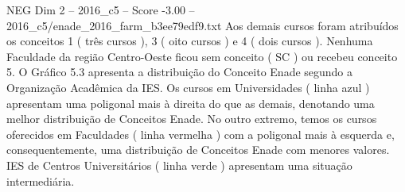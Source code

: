 \begin{textsample}{NEG Dim 2 – 2016\_c5 – Score -3.00 – 2016\_c5/enade\_2016\_farm\_b3ee79edf9.txt}
Aos demais cursos foram atribuídos os conceitos 1 ( três cursos ), 3 ( oito cursos ) e 4 ( dois cursos ).
Nenhuma Faculdade da região Centro-Oeste ficou sem conceito ( SC ) ou recebeu conceito 5.
O Gráfico 5.3 apresenta a distribuição do Conceito Enade segundo a Organização Acadêmica da IES.
Os cursos em Universidades ( linha azul ) apresentam uma poligonal mais à direita do que as demais, denotando uma melhor distribuição de Conceitos Enade.
No outro extremo, temos os cursos oferecidos em Faculdades ( linha vermelha ) com a poligonal mais à esquerda e, consequentemente, uma distribuição de Conceitos Enade com menores valores.
IES de Centros Universitários ( linha verde ) apresentam uma situação intermediária.

\end{textsample}
